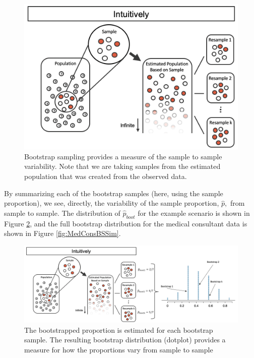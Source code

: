 \documentclass[
  10pt,
  openany]{book}
\begin{document}
\begin{figure}[h]

{\centering \includegraphics[width=0.75\linewidth]{images/boot1prop2} 

}

\caption{Bootstrap sampling provides a measure of the sample to sample variability.  Note that we are taking samples from the estimated population that was created from the observed data.}\label{fig:boot2}
\end{figure}

By summarizing each of the bootstrap samples (here, using the sample proportion), we see, directly, the variability of the sample proportion, \(\hat{p},\) from sample to sample.
The distribution of \(\hat{p}_{boot}\) for the example scenario is shown in Figure \ref{fig:boot3}, and the full bootstrap distribution for the medical consultant data is shown in Figure \ref{fig:MedConsBSSim}.

\begin{figure}[h]

{\centering \includegraphics[width=0.95\linewidth]{images/boot1prop3} 

}

\caption{The bootstrapped proportion is estimated for each bootstrap sample.  The resulting bootstrap distribution (dotplot) provides a measure for how the proportions vary from sample to sample}\label{fig:boot3}
\end{figure}
\end{document}
